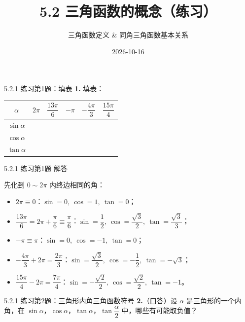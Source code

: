 \documentclass[10pt,aspectratio=169,serif]{beamer}
\title[5.2 三角函数的概念练习]{5.2 三角函数的概念（练习）}
\subtitle{三角函数定义 \& 同角三角函数基本关系}
\author{}
\institute{}
\date{2026-10-16}
\begin{document}
\begin{frame}
  \titlepage
\end{frame}

\begin{frame}[t]{5.2.1 练习第1题：填表}
\textbf{1.} 填表：
\vspace{0.5em}
\begin{center}
\begin{tabular}{|c|c|c|c|c|c|}
\hline
$\alpha$ & $2\pi$ & $\dfrac{13\pi}{6}$ & $-\pi$ & $-\dfrac{4\pi}{3}$ & $\dfrac{15\pi}{4}$ \\
\hline
$\sin\alpha$ & & & & & \\
\hline
$\cos\alpha$ & & & & & \\
\hline
$\tan\alpha$ & & & & & \\
\hline
\end{tabular}
\end{center}
\end{frame}

\begin{frame}[t]{5.2.1 练习第1题 解答}
\begin{tcolorbox}[colback=orange!10,colframe=orange,title=\textbf{解}]
先化到 $0\sim 2\pi$ 内终边相同的角：
\begin{itemize}
  \item $2\pi\equiv 0$：$\sin=0,\ \cos=1,\ \tan=0$；
  \item $\dfrac{13\pi}{6}=2\pi+\dfrac{\pi}{6}\equiv\dfrac{\pi}{6}$：$\sin=\dfrac{1}{2},\ \cos=\dfrac{\sqrt{3}}{2},\ \tan=\dfrac{\sqrt{3}}{3}$；
  \item $-\pi\equiv\pi$：$\sin=0,\ \cos=-1,\ \tan=0$；
  \item $-\dfrac{4\pi}{3}+2\pi=\dfrac{2\pi}{3}$：$\sin=\dfrac{\sqrt{3}}{2},\ \cos=-\dfrac{1}{2},\ \tan=-\sqrt{3}$；
  \item $\dfrac{15\pi}{4}-2\pi=\dfrac{7\pi}{4}$：$\sin=-\dfrac{\sqrt{2}}{2},\ \cos=\dfrac{\sqrt{2}}{2},\ \tan=-1$。
\end{itemize}
\end{tcolorbox}
\end{frame}

\begin{frame}[t]{5.2.1 练习第2题：三角形内角三角函数符号}
\textbf{2.}（口答）设 $\alpha$ 是三角形的一个内角，在 $\sin\alpha$，$\cos\alpha$，$\tan\alpha$，$\tan\dfrac{\alpha}{2}$ 中，哪些有可能取负值？
\end{frame}
\end{document}
